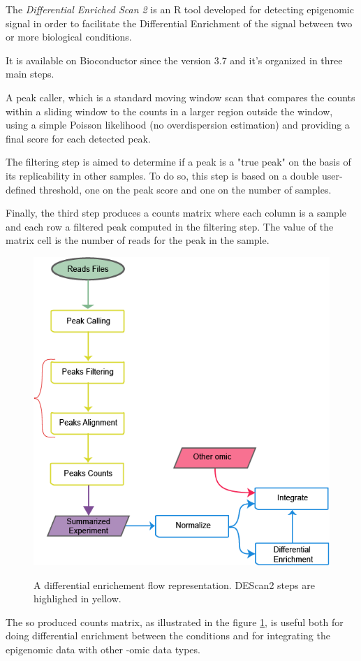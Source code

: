 The \textit{Differential Enriched Scan 2} is an R \cite{Ihaka1996} tool developed for detecting epigenomic signal in order to facilitate the Differential Enrichment of the signal between two or more biological conditions.

It is available on Bioconductor \cite{Gentleman2004} since the version 3.7 and it's organized in three main steps.

A peak caller, which is a standard moving window scan that compares the counts within a sliding window to the counts in a larger region outside the window, using a simple Poisson likelihood (no overdispersion estimation) and providing a final score for each detected peak. 

The filtering step is aimed to determine if a peak is a "true peak" on the basis of its replicability in other samples. To do so, this step is based on a double user-defined threshold, one on the peak score and one on the number of samples.


Finally, the third step produces a counts matrix where each column is a sample and each row a filtered peak computed in the filtering step. The value of the matrix cell is the number of reads for the peak in the sample.

\begin{figure}[h]
\caption{A differential enrichement flow representation. DEScan2 steps are highlighed in yellow.}
\includegraphics[width=\textwidth,height=\textheight,keepaspectratio]{img/descan2/flow.png}
\label{fig:descan2flow}
\centering
\end{figure}

The so produced counts matrix, as illustrated in the figure \ref{fig:descan2flow}, is useful both for doing differential enrichment between the conditions and for integrating the epigenomic data with other -omic data types.

